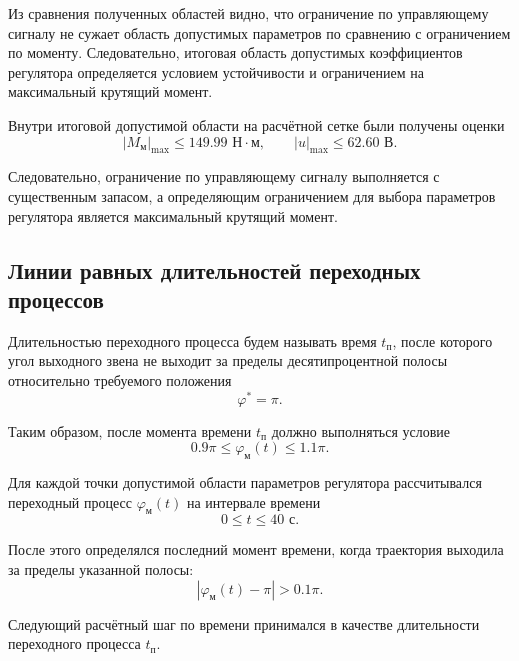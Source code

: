 
Из сравнения полученных областей видно, что ограничение по управляющему сигналу не сужает область допустимых параметров по сравнению с ограничением по моменту. Следовательно, итоговая область допустимых коэффициентов регулятора определяется условием устойчивости и ограничением на максимальный крутящий момент.

Внутри итоговой допустимой области на расчётной сетке были получены оценки
\begin{equation}
|M_{\text{м}}|_{\max} \le 149.99 \text{ Н}\cdot\text{м},
\qquad
|u|_{\max} \le 62.60 \text{ В}.
\end{equation}

Следовательно, ограничение по управляющему сигналу выполняется с существенным запасом, а определяющим ограничением для выбора параметров регулятора является максимальный крутящий момент.

\subsection{Линии равных длительностей переходных процессов}

Длительностью переходного процесса будем называть время \(t_{\text{п}}\), после которого угол выходного звена не выходит за пределы десятипроцентной полосы относительно требуемого положения
\begin{equation}
\varphi^* = \pi.
\end{equation}

Таким образом, после момента времени \(t_{\text{п}}\) должно выполняться условие
\begin{equation}
0.9\pi \le \varphi_{\text{м}}(t) \le 1.1\pi.
\end{equation}

Для каждой точки допустимой области параметров регулятора рассчитывался переходный процесс \(\varphi_{\text{м}}(t)\) на интервале времени
\begin{equation}
0 \le t \le 40 \text{ с}.
\end{equation}

После этого определялся последний момент времени, когда траектория выходила за пределы указанной полосы:
\begin{equation}
|\varphi_{\text{м}}(t)-\pi| > 0.1\pi.
\end{equation}

Следующий расчётный шаг по времени принимался в качестве длительности переходного процесса \(t_{\text{п}}\).

